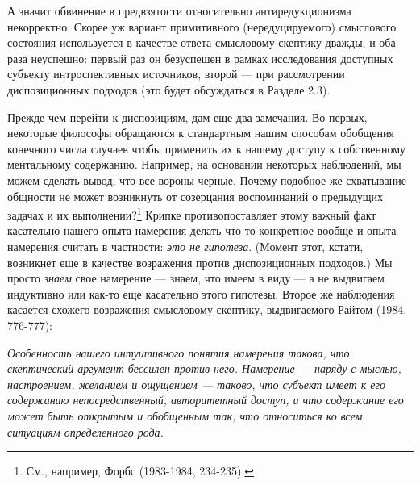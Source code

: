 \documentclass[11pt]{book}
\begin{document}
А значит обвинение в предвзятости относительно антиредукционизма некорректно. Скорее уж вариант примитивного (нередуцируемого) смыслового состояния используется в качестве ответа смысловому скептику дважды, и оба раза неуспешно: первый раз он безуспешен в рамках исследования доступных субъекту интроспективных источников, второй --- при рассмотрении диспозиционных подходов (это будет обсуждаться в Разделе 2.3).

Прежде чем перейти к диспозициям, дам еще два замечания. Во-первых, некоторые философы обращаются к стандартным нашим способам обобщения конечного числа случаев чтобы применить их к нашему доступу к собственному ментальному содержанию. Например, на основании некоторых наблюдений, мы можем сделать вывод, что все вороны черные. Почему подобное же схватывание общности не может возникнуть от созерцания воспоминаний о предыдущих задачах и их выполнении?\footnote{См., например, Форбс (1983-1984, 234-235).} Крипке противопоставляет этому важный факт касательно нашего опыта намерения делать что-то конкретное вообще и опыта намерения считать в частности: \textit{это не гипотеза}. (Момент этот, кстати, возникнет еще в качестве возражения против диспозиционных подходов.) Мы просто \textit{знаем} свое намерение --- знаем, что имеем в виду --- а не выдвигаем индуктивно или как-то еще касательно этого гипотезы. Второе же наблюдения касается схожего возражения смысловому скептику, выдвигаемого Райтом (1984, 776-777):

\smallskip

\textit{Особенность нашего интуитивного понятия намерения такова, что скептический аргумент бессилен против него. Намерение --- наряду с мыслью, настроением, желанием и ощущением --- таково, что субъект имеет к его содержанию непосредственный, авторитетный доступ, и что содержание его может быть открытым и обобщенным так, что относиться ко всем ситуациям определенного рода.}

\smallskip
\end{document}
